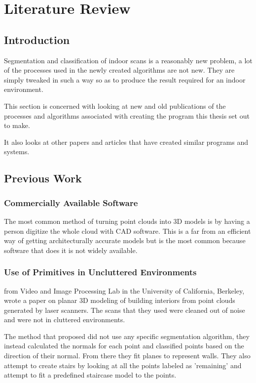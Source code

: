 \chapter{Literature Review}

\section{Introduction}
	Segmentation and classification of indoor scans is a reasonably new problem, a lot of the processes used in the newly created algorithms are not new. They are simply tweaked in such a way so as to produce the result required for an indoor environment. 
	
	This section is concerned with looking at new and old publications of the processes and algorithms associated with creating the program this thesis set out to make.
	
	It also looks at other papers and articles that have created similar programs and systems.
	
\section{Previous Work}

	\subsection{Commercially Available Software}
	
		The most common method of turning point clouds into 3D models is by having a person digitize the whole cloud with CAD software. This is a far from an efficient way of getting architecturally accurate models but is the most common because software that does it is not widely available. 

	\subsection{Use of Primitives in Uncluttered Environments}
		\cite{sanchez_planar_2012} from Video and Image Processing Lab in the University of California, Berkeley, wrote a paper on planar 3D modeling of building interiors from point clouds generated by laser scanners. The scans that they used were cleaned out of noise and were not in cluttered environments.
		
		The method that \citeauthor{sanchez_planar_2012} proposed did not use any specific segmentation algorithm, they instead calculated the normals for each point and classified points based on the direction of their normal. From there they fit planes to represent walls. They also attempt to create stairs by looking at all the points labeled as 'remaining' and attempt to fit a predefined staircase model to the points.
		
